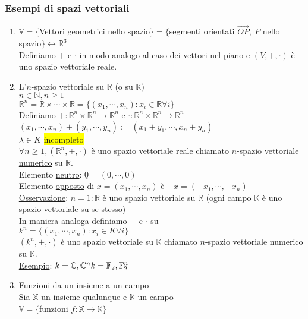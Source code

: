 \documentclass{article}
\newcommand{\hl}[1]{\colorbox{yellow}{#1}}
\newcommand{\ul}[1]{\underline{#1}}
\newcommand{\R}{\mathbb{R}}
\begin{document}
\subsubsection*{Esempi di spazi vettoriali}
\begin{enumerate}
	\item $\mathbb{V}=\{$Vettori geometrici nello spazio$\}=\{$segmenti orientati $\vec{OP},\ P$ nello spazio$\}\longleftrightarrow\R^3$\\
	      Definiamo $+$ e $\cdot$ in modo analogo al caso dei vettori nel piano e $(V,+,\cdot)$ è uno spazio vettoriale reale.
	\item L'$n$-spazio vettoriale su $\R$ (o su $\mathbb{K}$)\\
	      $n\in\mathbb{N},n\ge1$\\
	      $\R^n=\R\times\cdots\times\R=\{(x_1,\cdots,x_n):x_i\in\R\forall i\}$\\
	      Definiamo $+:\R^n\times\R^n\to\R^n$ e $\cdot:\R^n\times\R^n\to\R^n$\\
	      $(x_1,\cdots,x_n)+(y_1,\cdots,y_n):=(x_1+y_1,\cdots,x_n+y_n)$\\
	      $\lambda\in K$ \hl{incompleto}\\
	      $\forall n\ge1,(\R^n,+,\cdot)$ è uno spazio vettoriale reale chiamato $n$-spazio vettoriale \ul{numerico} su $\R$.\\
	      Elemento \ul{neutro}: $\ul{0}=(0,\cdots,0)$\\
	      Elemento \ul{opposto} di $x=(x_1,\cdots,x_n)$ è $-x=(-x_1,\cdots,-x_n)$\\
	      \ul{Osservazione}: $n=1:\R$ è uno spazio vettoriale su $\R$ (ogni campo $\mathbb{K}$ è uno spazio vettoriale su se stesso)\\
	      In maniera analoga definiamo $+$ e $\cdot$ su\\
	      $k^n=\{(x_1,\cdots,x_n):x_i\in K\forall i\}$\\
	      $(k^n,+,\cdot)$ è uno spazio vettoriale su $\mathbb{K}$ chiamato $n$-spazio vettoriale numerico su $\mathbb{K}$.\\
	      \ul{Esempio}: $k=\mathbb{C},\mathbb{C}^n\\k=\mathbb{F}_2,\mathbb{F}^n_2$
	\item Funzioni da un insieme a un campo\\
	      Sia $\mathbb{X}$ un insieme \ul{qualunque} e $\mathbb{K}$ un campo\\
	      $\mathbb{V}=\{$funzioni $f:\mathbb{X}\to\mathbb{K}\}$
	      \begin{itemize}

\end{itemize}
\end{enumerate}
\end{document}

